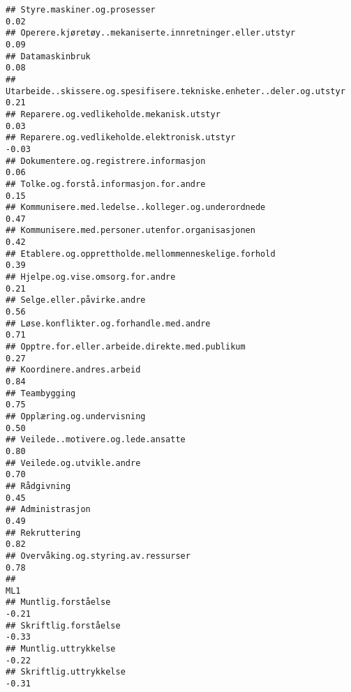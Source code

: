 \documentclass[
]{article}
\begin{document}
\begin{verbatim}
## Styre.maskiner.og.prosesser                                                       0.02
## Operere.kjøretøy..mekaniserte.innretninger.eller.utstyr                           0.09
## Datamaskinbruk                                                                    0.08
## Utarbeide..skissere.og.spesifisere.tekniske.enheter..deler.og.utstyr              0.21
## Reparere.og.vedlikeholde.mekanisk.utstyr                                          0.03
## Reparere.og.vedlikeholde.elektronisk.utstyr                                      -0.03
## Dokumentere.og.registrere.informasjon                                             0.06
## Tolke.og.forstå.informasjon.for.andre                                             0.15
## Kommunisere.med.ledelse..kolleger.og.underordnede                                 0.47
## Kommunisere.med.personer.utenfor.organisasjonen                                   0.42
## Etablere.og.opprettholde.mellommenneskelige.forhold                               0.39
## Hjelpe.og.vise.omsorg.for.andre                                                   0.21
## Selge.eller.påvirke.andre                                                         0.56
## Løse.konflikter.og.forhandle.med.andre                                            0.71
## Opptre.for.eller.arbeide.direkte.med.publikum                                     0.27
## Koordinere.andres.arbeid                                                          0.84
## Teambygging                                                                       0.75
## Opplæring.og.undervisning                                                         0.50
## Veilede..motivere.og.lede.ansatte                                                 0.80
## Veilede.og.utvikle.andre                                                          0.70
## Rådgivning                                                                        0.45
## Administrasjon                                                                    0.49
## Rekruttering                                                                      0.82
## Overvåking.og.styring.av.ressurser                                                0.78
##                                                                                    ML1
## Muntlig.forståelse                                                               -0.21
## Skriftlig.forståelse                                                             -0.33
## Muntlig.uttrykkelse                                                              -0.22
## Skriftlig.uttrykkelse                                                            -0.31

\end{verbatim}
\end{document}
